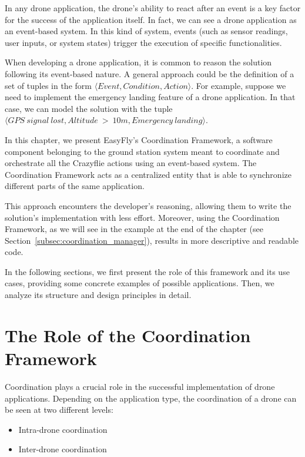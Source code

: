 In any drone application, the drone's ability to react after an event is a key factor for the success of the application itself. 
In fact, we can see a drone application as an event-based system. 
In this kind of system, events (such as sensor readings, user inputs, or system states) trigger the execution of specific functionalities.

When developing a drone application, it is common to reason the solution following its event-based nature.
A general approach could be the definition of a set of tuples in the form \( \langle Event, Condition, Action \rangle \).
For example, suppose we need to implement the emergency landing feature of a drone application. 
In that case, we can model the solution with the tuple \( \langle GPS~signal~lost, Altitude~>~10m, Emergency~landing \rangle \).

In this chapter, we present EasyFly's Coordination Framework, a software component belonging to the ground station system meant to coordinate and orchestrate all the Crazyflie actions using an event-based system.
The Coordination Framework acts as a centralized entity that is able to synchronize different parts of the same application.

This approach encounters the developer's reasoning, allowing them to write the solution's implementation with less effort. 
Moreover, using the Coordination Framework, as we will see in the example at the end of the chapter (see Section~\ref{subsec:coordination_manager}), results in more descriptive and readable code.

In the following sections, we first present the role of this framework and its use cases, providing some concrete examples of possible applications. 
Then, we analyze its structure and design principles in detail.

\pagebreak%
\section{The Role of the Coordination Framework}\label{sec:coordination_framework_role}

Coordination plays a crucial role in the successful implementation of drone applications. 
Depending on the application type, the coordination of a drone can be seen at two different levels:
\begin{itemize}
    \item Intra-drone coordination
    \item Inter-drone coordination
\end{itemize}


